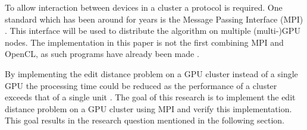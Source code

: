 To allow interaction between devices in a cluster a protocol is required.
One standard which has been around for years is the Message Passing Interface (MPI) \cite{MPI}.
This interface will be used to distribute the algorithm on multiple (multi-)GPU nodes.
The implementation in this paper is not the first combining MPI and OpenCL, as such programs have already been made \cite{Cluster}.


By implementing the edit distance problem on a GPU cluster instead of a single GPU the processing time could be reduced as the performance of a cluster exceeds that of a single unit \cite{Cluster}.
The goal of this research is to implement the edit distance problem on a GPU cluster using MPI and verify this implementation.
This goal results in the research question mentioned in the following section.

